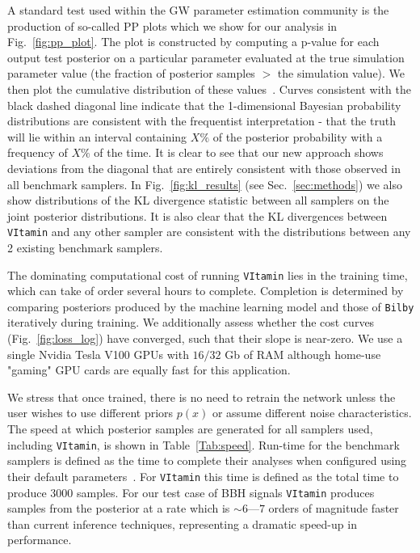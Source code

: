 \documentclass[%
showpacs,
 amsmath,amssymb,
 aps,
 twocolumn,
 prl,
 reprint,
floatfix,
]{revtex4-1}
\newcommand{\chris}[1]{\textbf{\textcolor{red}{CHRIS: #1}}}
\begin{document}
%
%
A standard test used within the \ac{GW} parameter estimation community is the
production of so-called \ac{PP} plots which we show for our analysis in
Fig.~\ref{fig:pp_plot}. The plot is constructed by computing a p-value for each
output test posterior on a particular parameter evaluated at the true
simulation parameter value (the fraction of posterior samples $>$ the
simulation value). We then plot the cumulative distribution of these
values~\cite{1409.7215}. Curves consistent with the black dashed diagonal line
indicate that the 1-dimensional Bayesian probability distributions are
consistent with the frequentist interpretation - that the truth will lie within
an interval containing $X\%$ of the posterior probability with a frequency of
$X\%$ of the time. It is clear to see that our new approach shows deviations
from the diagonal that are entirely consistent with those observed in all
benchmark samplers. In Fig.~\ref{fig:kl_results} (see Sec.~\ref{sec:methods})
we also show distributions of the \ac{KL} divergence statistic between all
samplers on the joint posterior distributions. It is also clear that the
\ac{KL} divergences between \texttt{VItamin} and any other sampler are
consistent with the distributions between any 2 existing benchmark samplers.      

%
%
The dominating computational cost of running \texttt{VItamin} lies in the
training time, which can take of order several hours to complete.  Completion
is determined by comparing posteriors produced by the machine learning model
and those of \texttt{Bilby} iteratively during training. We additionally assess
whether the cost curves (Fig.~\ref{fig:loss_log}) have converged, such that 
their slope is near-zero. We use a 
single Nvidia Tesla V100 \acp{GPU} with $16/32$ Gb of RAM although home-use
"gaming" \ac{GPU} cards are equally fast for this application. 

We stress that
once trained, there is no need to retrain the network unless the user wishes to
use different priors $p(x)$ or assume different noise characteristics.   The
speed at which posterior samples are generated for all samplers used, including
\texttt{VItamin}, is shown in Table~\ref{Tab:speed}. Run-time for the benchmark
samplers is defined as the time to complete their analyses when configured
using their default parameters~\cite{1811.02042}. For \texttt{VItamin} this
time is defined as the total time to produce $3000$ samples. For our test case
of \ac{BBH} signals \texttt{VItamin} produces samples from the posterior at a
rate which is $\sim 6$---$7$ orders of magnitude faster than current inference
techniques, representing a dramatic speed-up in performance. 
\end{document}
